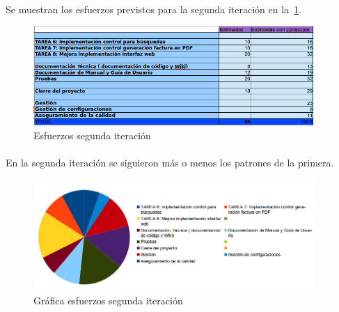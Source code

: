 \paragraph{} Se muestran los esfuerzos previstos para la segunda iteración en la~\cref{fig:6143}.

\begin{figure}[h!]
\centering
\includegraphics[width=0.95\textwidth]{img/6143}
\caption{Esfuerzos segunda iteración}
 \label{fig:6143}
\end{figure}

\paragraph{} En la segunda iteración se siguieron más o menos los patrones de la primera.

\begin{figure}[h!]
\centering
\includegraphics[width=0.95\textwidth]{img/6144}
\caption{Gráfica esfuerzos segunda iteración}
 \label{fig:6144}
\end{figure}